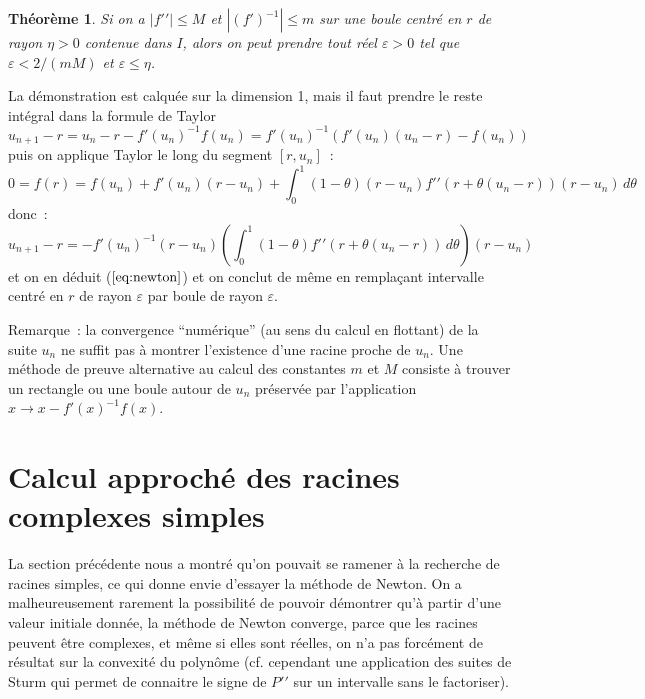 \documentclass[a4paper,11pt]{book}
\newtheorem{thm}{Théorème}
\begin{document}
\begin{giacjshere}
\begin{thm}
Si on a $|f'{'}| \leq M$ et $|(f')^{-1}| \leq m$ sur une boule
centr\'e en $r$ de rayon $\eta>0$ contenue dans $I$, alors on peut prendre tout r\'eel
$\varepsilon>0$ tel que $\varepsilon < 2/(mM)$ et $\varepsilon \leq \eta$.
\end{thm}
La d\'emonstration est calqu\'ee sur la dimension 1, mais il faut
prendre le reste int\'egral dans la formule de Taylor
\[ u_{n+1}-r = u_n - r - f'(u_n)^{-1} f(u_n) = 
f'(u_n)^{-1} (f'(u_n)(u_n-r)-f(u_n) ) \]
puis on applique Taylor le long du segment $[r,u_n]$~:
\[ 0 = f(r)=f(u_n)+ f'(u_n) (r-u_n)+  \int_0^1 (1-\theta)(r-u_n)
f'{'}(r+\theta (u_n-r)) (r-u_n) \, d\theta \]
donc~:
$$u_{n+1}-r =-f'(u_n)^{-1}  (r-u_n) 
\left(\int_0^1 (1-\theta)f'{'}(r+\theta (u_n-r)) \, d\theta \right) (r-u_n)  $$
et on en d\'eduit (\(\ref{eq:newton}\)) et on conclut de m\^eme en
rempla\c{c}ant intervalle centr\'e en $r$ de rayon $\varepsilon$
par boule de rayon $\varepsilon$.

Remarque~: la convergence ``num\'erique'' (au sens du calcul en
flottant) de la suite $u_n$ ne suffit pas \`a montrer l'existence
d'une racine proche de $u_n$. Une m\'ethode de preuve alternative
au calcul des constantes $m$ et $M$ consiste
\`a trouver un rectangle ou une boule autour de $u_n$ pr\'eserv\'ee
par l'application $x\rightarrow x-f'(x)^{-1} f(x)$.



\section{Calcul approch\'e des racines complexes simples} 
  \label{sec:proot}
La section pr\'ec\'edente nous a montr\'e qu'on pouvait
se ramener \`a la recherche de racines simples, ce qui 
donne envie d'essayer la m\'ethode de Newton. On a malheureusement
rarement la possibilit\'e de pouvoir d\'emontrer qu'\`a partir d'une valeur
initiale donn\'ee, la m\'ethode de Newton converge, 
parce que les racines peuvent \^etre complexes, et m\^eme si elles
sont r\'eelles, on n'a pas forc\'ement de r\'esultat sur la convexit\'e
du polyn\^ome (cf. cependant une application des suites de
Sturm qui permet de connaitre le signe
de $P'{'}$ sur un intervalle sans le factoriser).


\end{giacjshere}
\end{document}

